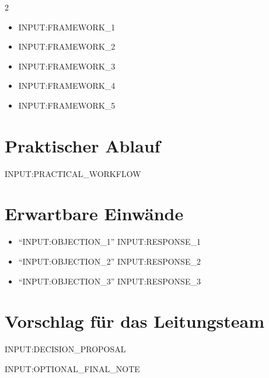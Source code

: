 \documentclass[a4paper]{article}
\begin{document}
\begin{multicols}{2}
\begin{itemize}
  \item[-] {{INPUT:FRAMEWORK_1}}
  \item[-] {{INPUT:FRAMEWORK_2}}
  \item[-] {{INPUT:FRAMEWORK_3}}
  \item[-] {{INPUT:FRAMEWORK_4}}
  \item[-] {{INPUT:FRAMEWORK_5}}
\end{itemize}

\section{Praktischer Ablauf}
\label{sec:Praktischer Ablauf}

{{INPUT:PRACTICAL_WORKFLOW}}

\section{Erwartbare Einwände}
\label{sec:Erwartbare Einwände}

\begin{itemize}
  \item[-] \enquote{{{INPUT:OBJECTION_1}}} {{INPUT:RESPONSE_1}}
  \item[-] \enquote{{{INPUT:OBJECTION_2}}} {{INPUT:RESPONSE_2}}
  \item[-] \enquote{{{INPUT:OBJECTION_3}}} {{INPUT:RESPONSE_3}}
\end{itemize}

\section{Vorschlag für das Leitungsteam}
\label{sec:Vorschlag für das Leitungsteam}

{{INPUT:DECISION_PROPOSAL}}

{{INPUT:OPTIONAL_FINAL_NOTE}}

\end{multicols}

\vspace{2 mm}
{\footnotesize\printbibliography}
\end{document}
